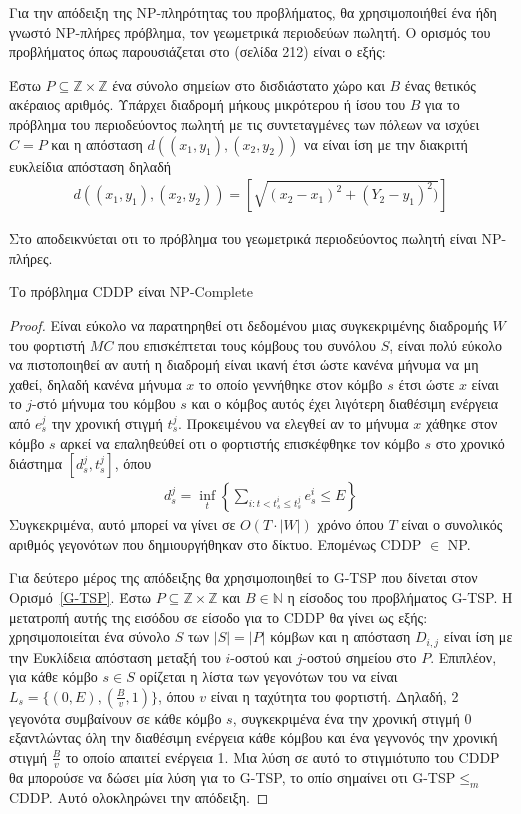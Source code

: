 Για την απόδειξη της NP-πληρότητας του προβλήματος, θα χρησιμοποιήθεί ένα ήδη γνωστό NP-πλήρες πρόβλημα, τον γεωμετρικά περιοδεύων πωλητή. Ο ορισμός του προβλήματος
όπως παρουσιάζεται στο \cite{Garey_Johnson} (σελίδα 212) είναι ο εξής:
\begin{definition}
\label{G-TSP} 
Έστω $P \subseteq \mathbb{Z} \times \mathbb{Z}$ ένα σύνολο σημείων στο δισδιάστατο χώρο και $B$ ένας θετικός ακέραιος αριθμός.
Υπάρχει διαδρομή μήκους μικρότερου ή ίσου του $B$ για το πρόβλημα του περιοδεύοντος πωλητή με τις συντεταγμένες των πόλεων να ισχύει $C=P$ και η απόσταση
$d((x_{1},y_{1}),(x_{2},y_{2}))$ να είναι ίση με την διακριτή ευκλείδια απόσταση δηλαδή
\begin{align*}
d((x_{1},y_{1}),(x_{2},y_{2})) = [\sqrt{(x_{2}-x_{1})^{2} + (Y_{2}-y_{1})^{2})}]
\end{align*}
\end{definition}
Στο \cite{PapadimitriouNP} αποδεικνύεται οτι το πρόβλημα του γεωμετρικά περιοδεύοντος πωλητή είναι NP-πλήρες.
\begin{theorem}
Το πρόβλημα CDDP είναι NP-Complete
\end{theorem}
\begin{proof}
Είναι εύκολο να παρατηρηθεί οτι δεδομένου μιας συγκεκριμένης διαδρομής $W$ του φορτιστή $MC$ που επισκέπτεται τους κόμβους του συνόλου $S$, είναι πολύ εύκολο να
πιστοποιηθεί αν αυτή η διαδρομή είναι ικανή έτσι ώστε κανένα μήνυμα να μη χαθεί, δηλαδή κανένα μήνυμα $x$ το οποίο γεννήθηκε στον κόμβο $s$ έτσι ώστε $x$ είναι το
$j$-στό μήνυμα του κόμβου $s$ και ο κόμβος αυτός έχει λιγότερη διαθέσιμη ενέργεια από $e^{j}_{s}$ την χρονική στιγμή $t^{j}_{s}$. Προκειμένου να ελεγθεί αν το μήνυμα
$x$ χάθηκε στον κόμβο $s$ αρκεί να επαληθεύθεί οτι ο φορτιστής επισκέφθηκε τον κόμβο $s$ στο χρονικό διάστημα $[d_s^j, t_s^j]$, όπου
\begin{align*}
d_s^j = \inf_t\left\{ \sum_{i: t < t_s^i \leq t_s^j} e_s^{i} \leq E \right\}
\end{align*}
Συγκεκριμένα, αυτό μπορεί να γίνει σε $O(T \cdot |W|)$ χρόνο όπου $T$ είναι ο συνολικός αριθμός γεγονότων που δημιουργήθηκαν στο δίκτυο. Επομένως CDDP $\in$ NP.

Για δεύτερο μέρος της απόδειξης θα χρησιμοποιηθεί το G-TSP που δίνεται στον Ορισμό~\ref{G-TSP}. Έστω $P \subseteq \mathbb{Z} \times \mathbb{Z}$ και $Β\in
\mathbb{N}$ η είσοδος του προβλήματος G-TSP. Η μετατροπή αυτής της εισόδου σε είσοδο για το CDDP θα γίνει ως εξής: χρησιμοποιείται ένα σύνολο $S$ των $|S|=|P|$
κόμβων και η απόσταση $D_{i,j}$ είναι ίση με την Ευκλίδεια απόσταση μεταξή του $i$-οστού και $j$-οστού σημείου στο $P$. Επιπλέον, για κάθε κόμβο $s\in S$
ορίζεται η λίστα των γεγονότων του να είναι $L_{s} = \{(0, E), (\frac{B}{v}, 1)\}$, όπου $v$ είναι η ταχύτητα του φορτιστή. Δηλαδή, 2 γεγονότα συμβαίνουν σε κάθε
κόμβο $s$, συγκεκριμένα ένα την χρονική στιγμή 0 εξαντλώντας όλη την διαθέσιμη ενέργεια κάθε κόμβου και ένα γεγνονός την χρονική στιγμή $\frac{B}{v}$ το οποίο
απαιτεί ενέργεια 1. Μια λύση σε αυτό το στιγμιότυπο του CDDP θα μπορούσε να δώσει μία λύση για το G-TSP, το οπίο σημαίνει οτι G-TSP$\leq_{m}$CDDP. Αυτό ολοκληρώνει
την απόδειξη.
\end{proof}
